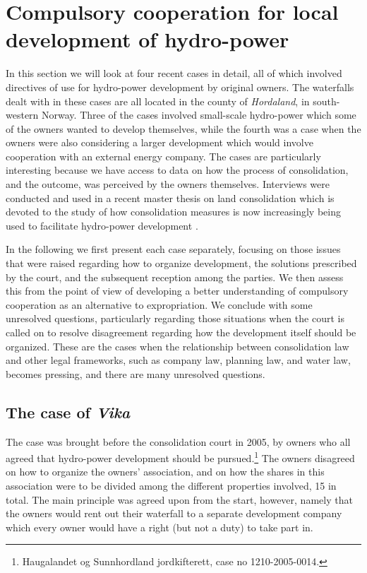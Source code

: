 \section{Compulsory cooperation for local development of hydro-power}\label{sec:4}

In this section we will look at four recent cases in detail, all of which involved directives of use for hydro-power development by original owners. The waterfalls dealt with in these cases are all located in the county of \emph{Hordaland}, in south-western Norway. Three of the cases involved small-scale hydro-power which some of the owners wanted to develop themselves, while the fourth was a case when the owners were also considering a larger development which would involve cooperation with an external energy company. The cases are particularly interesting because we have access to data on how the process of consolidation, and the outcome, was perceived by the owners themselves. Interviews were conducted and used in a recent master thesis on land consolidation which is devoted to the study of how consolidation measures is now increasingly being used to facilitate hydro-power development \cite{master}.

In the following we first present each case separately, focusing on those issues that were raised regarding how to organize development, the solutions prescribed by the court, and the subsequent reception among the parties. We then assess this from the point of view of developing a better understanding of compulsory cooperation as an alternative to expropriation. We conclude with some unresolved questions, particularly regarding those situations when the court is called on to resolve disagreement regarding how the development itself should be organized. These are the cases when the relationship between consolidation law and other legal frameworks, such as company law, planning law, and water law, becomes pressing, and there are many unresolved questions.

\subsection{The case of \emph{Vika}}

The case was brought before the consolidation court in 2005, by owners who all agreed that hydro-power development should be pursued.\footnote{Haugalandet og Sunnhordland jordkifterett, case no 1210-2005-0014.} The owners disagreed on how to organize the owners' association, and on how the shares in this association were to be divided among the different properties involved, 15 in total. The main principle was agreed upon from the start, however, namely that the owners would rent out their waterfall to a separate development company which every owner would have a right (but not a duty) to take part in. 

